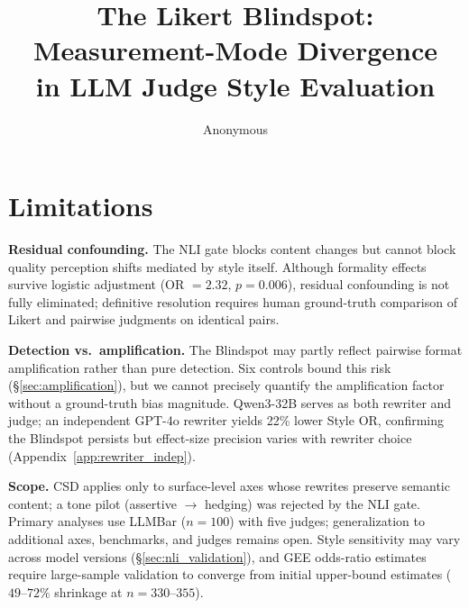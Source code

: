 \documentclass[11pt]{article}
\title{The Likert Blindspot: Measurement-Mode Divergence\\in LLM Judge Style Evaluation}
\author{Anonymous}
\begin{document}
\maketitle













\section*{Limitations}
\label{sec:limitations}

\textbf{Residual confounding.}
The NLI gate blocks content changes but cannot block quality perception shifts mediated by style itself.
Although formality effects survive logistic adjustment (OR $= 2.32$, $p = 0.006$), residual confounding is not fully eliminated; definitive resolution requires human ground-truth comparison of Likert and pairwise judgments on identical pairs.

\textbf{Detection vs.\ amplification.}
The Blindspot may partly reflect pairwise format amplification \citep{jeong2025comparative} rather than pure detection.
Six controls bound this risk (\S\ref{sec:amplification}), but we cannot precisely quantify the amplification factor without a ground-truth bias magnitude.
Qwen3-32B serves as both rewriter and judge; an independent GPT-4o rewriter yields 22\% lower Style OR, confirming the Blindspot persists but effect-size precision varies with rewriter choice (Appendix~\ref{app:rewriter_indep}).

\textbf{Scope.}
CSD applies only to surface-level axes whose rewrites preserve semantic content; a tone pilot (assertive $\to$ hedging) was rejected by the NLI gate.
Primary analyses use LLMBar ($n = 100$) with five judges; generalization to additional axes, benchmarks, and judges remains open.
Style sensitivity may vary across model versions (\S\ref{sec:nli_validation}), and GEE odds-ratio estimates require large-sample validation to converge from initial upper-bound estimates ($49$--$72\%$ shrinkage at $n = 330$--$355$).




\end{document}
